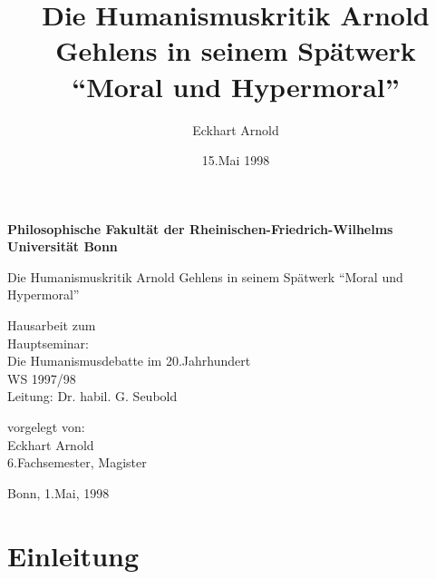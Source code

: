 \documentclass[12pt,a4paper]{article}
\begin{document}
\begin{titlepage}

\title{Die Humanismuskritik Arnold Gehlens in seinem
    Spätwerk "`Moral und Hypermoral"'}
\author{Eckhart Arnold}
\date{15.Mai 1998}

\setlength{\parindent}{0em}

\begin{center} {\large\bf Philosophische Fakultät der
    Rheinischen-Friedrich-Wilhelms Universität Bonn} \end{center}

\setlength{\parskip}{2cm}

\begin{center} {\Large Die Humanismuskritik Arnold Gehlens in seinem
    Spätwerk "`Moral und Hypermoral"'} \end{center}

\setlength{\parskip}{3cm}

Hausarbeit zum\\ Hauptseminar:\\ Die Humanismusdebatte im 
20.Jahrhundert\\ WS 1997/98\\[0.5cm]Leitung: Dr. habil. G. Seubold

\setlength{\parskip}{1cm}

vorgelegt von:\\[0.5cm]Eckhart Arnold\\6.Fachsemester, Magister

\setlength{\parskip}{1cm}

Bonn, 1.Mai, 1998

\end{titlepage}

 \tableofcontents

\newpage


\setcounter{page}{1}

\section{Einleitung}
\end{document}
